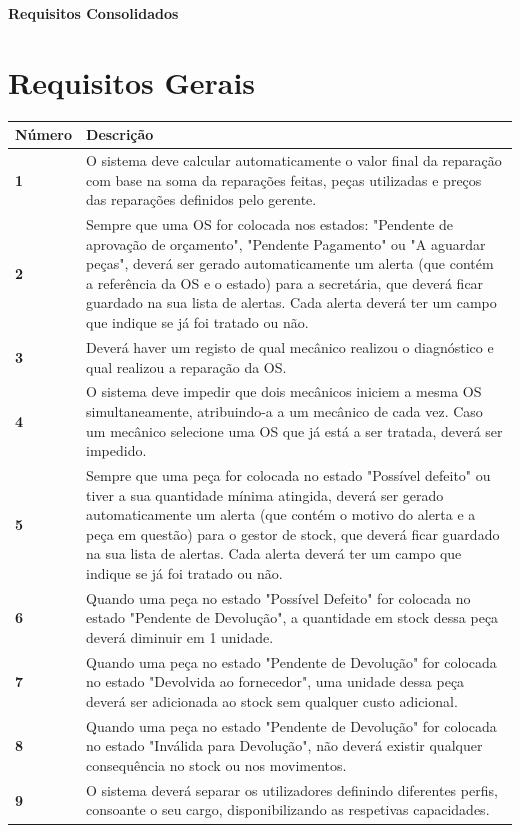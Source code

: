 \documentclass[11pt,a4paper]{article}
\begin{document}
	
	{\noindent\LARGE\bfseries\color{primaryblue} Requisitos Consolidados}
	
	\section*{Requisitos Gerais}
	
	\renewcommand{\arraystretch}{1.5}
	\begin{tabularx}{\textwidth}{@{}|l|X|@{}}
		\hline
		\rowcolor{gray!10} \textbf{Número} & \textbf{Descrição} \\ \hline
		\textbf{1} & O sistema deve calcular automaticamente o valor final da reparação com base na soma da reparações feitas, peças utilizadas e preços das reparações definidos pelo gerente. \\ \hline
		\textbf{2} & Sempre que uma OS for colocada nos estados: "Pendente de aprovação de orçamento", "Pendente Pagamento" ou "A aguardar peças", deverá ser gerado automaticamente um alerta (que contém a referência da OS e o estado) para a secretária, que deverá ficar guardado na sua lista de alertas. Cada alerta deverá ter um campo que indique se já foi tratado ou não. \\ \hline
		\textbf{3} & Deverá haver um registo de qual mecânico realizou o diagnóstico e qual realizou a reparação da OS. \\ \hline
		\textbf{4} & O sistema deve impedir que dois mecânicos iniciem a mesma OS simultaneamente, atribuindo-a a um mecânico de cada vez. Caso um mecânico selecione uma OS que já está a ser tratada, deverá ser impedido. \\ \hline
		\textbf{5} & Sempre que uma peça for colocada no estado "Possível defeito" ou tiver a sua quantidade mínima atingida, deverá ser gerado automaticamente um alerta (que contém o motivo do alerta e a peça em questão) para o gestor de stock, que deverá ficar guardado na sua lista de alertas. Cada alerta deverá ter um campo que indique se já foi tratado ou não. \\ \hline
		\textbf{6} & Quando uma peça no estado "Possível Defeito" for colocada no estado "Pendente de Devolução", a quantidade em stock dessa peça deverá diminuir em 1 unidade. \\ \hline
		\textbf{7} & Quando uma peça no estado "Pendente de Devolução" for colocada no estado "Devolvida ao fornecedor", uma unidade dessa peça deverá ser adicionada ao stock sem qualquer custo adicional. \\ \hline
		\textbf{8} & Quando uma peça no estado "Pendente de Devolução" for colocada no estado "Inválida para Devolução", não deverá existir qualquer consequência no stock ou nos movimentos. \\ \hline
		\textbf{9} & O sistema deverá separar os utilizadores definindo diferentes perfis, consoante o seu cargo, disponibilizando as respetivas capacidades. \\ \hline
	\end{tabularx}
	
\end{document}

